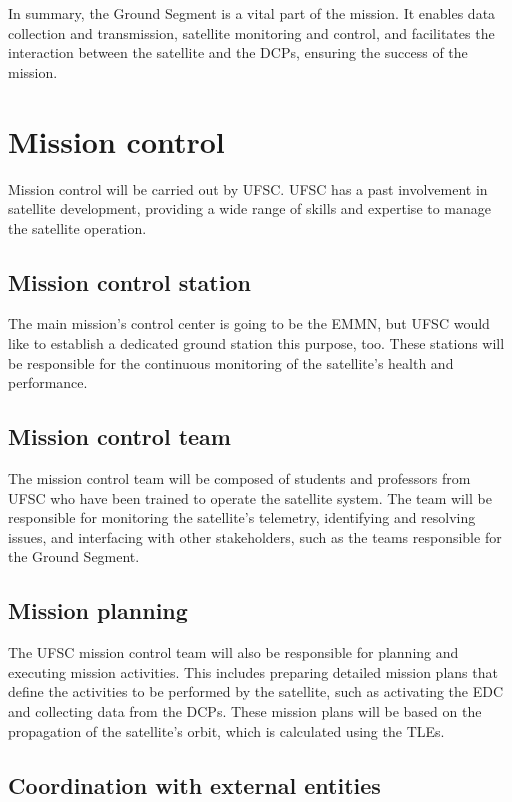 In summary, the Ground Segment is a vital part of the mission. It enables data collection and transmission, satellite monitoring and control, and facilitates the interaction between the satellite and the \acp{DCP}, ensuring the success of the mission.

\section{Mission control}

Mission control will be carried out by \ac{UFSC}. \ac{UFSC} has a past involvement in satellite development, providing a wide range of skills and expertise to manage the satellite operation.

\subsection{Mission control station}

The main mission's control center is going to be the \ac{EMMN}, but \ac{UFSC} would like to establish a dedicated ground station this purpose, too. These stations will be responsible for the continuous monitoring of the satellite's health and performance.

\subsection{Mission control team}

The mission control team will be composed of students and professors from \ac{UFSC} who have been trained to operate the satellite system. The team will be responsible for monitoring the satellite's telemetry, identifying and resolving issues, and interfacing with other stakeholders, such as the teams responsible for the Ground Segment.

\subsection{Mission planning}

The \ac{UFSC} mission control team will also be responsible for planning and executing mission activities. This includes preparing detailed mission plans that define the activities to be performed by the satellite, such as activating the \ac{EDC} and collecting data from the \acp{DCP}. These mission plans will be based on the propagation of the satellite's orbit, which is calculated using the \acp{TLE}.

\subsection{Coordination with external entities}

